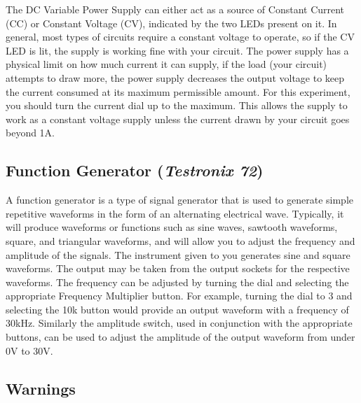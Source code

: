The DC Variable Power Supply can either act as a source of Constant Current (CC) or Constant Voltage (CV), indicated by the two LEDs present on it. In general, most types of circuits require a constant voltage to operate, so if the CV LED is lit, the supply is working fine with your circuit. The power supply has a physical limit on how much current it can supply, if the load (your circuit) attempts to draw more, the power supply decreases the output voltage to keep the current consumed at its maximum permissible amount. For this experiment, you should turn the current dial up to the maximum. This allows the supply to work as a constant voltage supply unless the current drawn by your circuit goes beyond 1A.

\subsection*{Function Generator (\textit{Testronix 72})}

A function generator is a type of signal generator that is used to generate simple repetitive waveforms in the form of an alternating electrical wave. Typically, it will produce waveforms or functions such as sine waves, sawtooth waveforms, square, and triangular waveforms, and will allow you to adjust the frequency and amplitude of  the signals. The instrument given to you generates sine and square waveforms. The output may be taken from the output sockets for the respective waveforms. The frequency can be adjusted by turning the dial and selecting the appropriate Frequency Multiplier button. For example, turning the dial to 3 and selecting the 10k button would provide an output waveform with a frequency of 30kHz. Similarly the amplitude switch, used in conjunction with the appropriate buttons, can be used to adjust the amplitude of the output waveform from under 0V to 30V.



\subsection*{Warnings}

